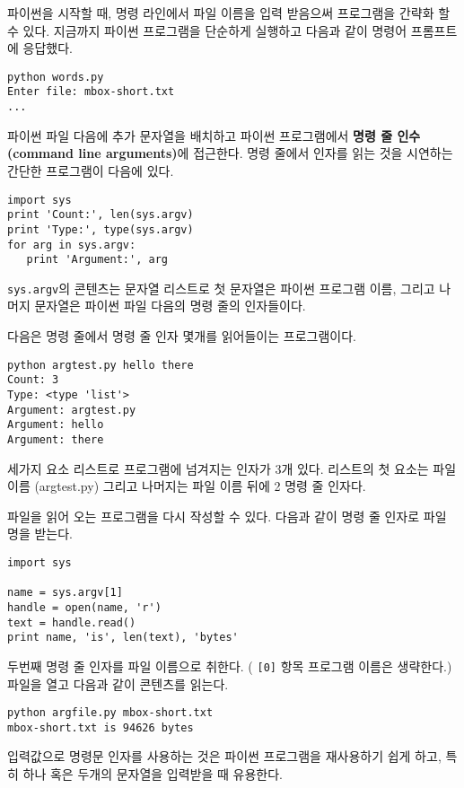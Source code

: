 파이썬을 시작할 때, 명령 라인에서 파일 이름을 입력 받음으써 프로그램을 간략화 할 수 있다.
지금까지 파이썬 프로그램을 단순하게 실행하고 다음과 같이 명령어 프롬프트에 응답했다.

\beforeverb
\begin{verbatim}
python words.py
Enter file: mbox-short.txt
...
\end{verbatim}
\afterverb
%

파이썬 파일 다음에 추가 문자열을 배치하고 파이썬 프로그램에서 
{\bf 명령 줄 인수(command line arguments)}에 접근한다.
명령 줄에서 인자를 읽는 것을 시연하는 간단한 프로그램이 다음에 있다.

\beforeverb
\begin{verbatim}
import sys
print 'Count:', len(sys.argv)
print 'Type:', type(sys.argv)
for arg in sys.argv:
   print 'Argument:', arg
\end{verbatim}
\afterverb
%
{\tt sys.argv}의 콘텐츠는 문자열 리스트로 첫 문자열은 파이썬 프로그램 이름,
그리고 나머지 문자열은 파이썬 파일 다음의 명령 줄의 인자들이다.

다음은 명령 줄에서 명령 줄 인자 몇개를 읽어들이는 프로그램이다. 

\beforeverb
\begin{verbatim}
python argtest.py hello there
Count: 3
Type: <type 'list'>
Argument: argtest.py
Argument: hello
Argument: there
\end{verbatim}
\afterverb
%

세가지 요소 리스트로 프로그램에 넘겨지는 인자가 3개 있다.
리스트의 첫 요소는 파일 이름 (argtest.py) 그리고 나머지는 파일 이름 뒤에 2 명령 줄 인자다.

파일을 읽어 오는 프로그램을 다시 작성할 수 있다. 
다음과 같이 명령 줄 인자로 파일 명을 받는다. 

\beforeverb
\begin{verbatim}
import sys

name = sys.argv[1]
handle = open(name, 'r')
text = handle.read()
print name, 'is', len(text), 'bytes'
\end{verbatim}
\afterverb
%

두번째 명령 줄 인자를 파일 이름으로 취한다. ( {\tt [0]} 항목 프로그램 이름은 생략한다.)
파일을 열고 다음과 같이 콘텐츠를 읽는다.

\beforeverb
\begin{verbatim}
python argfile.py mbox-short.txt
mbox-short.txt is 94626 bytes
\end{verbatim}
\afterverb
%

입력값으로 명령문 인자를 사용하는 것은 파이썬 프로그램을 재사용하기 쉽게 하고,
특히 하나 혹은 두개의 문자열을 입력받을 때 유용한다.


